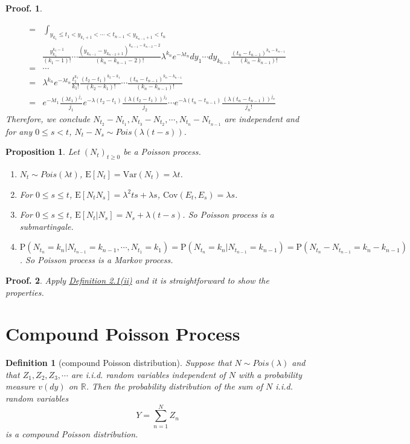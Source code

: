 \documentclass{article}
\newtheorem{definition}{Definition}[section]
\newtheorem{proposition}{Proposition}[section]
\theoremstyle{nonumberplain}
\newtheorem{Proof}{Proof.}
\begin{document}
\begin{Proof}
\begin{itemize}
\begin{align*}
	=&\ \int_{y_{k_1}\le t_1<y_{k_1+1}<\cdots<t_{n-1}<y_{k_{n-1}+1}<t_n}\\
	&\frac{y_{k_1}^{k_1-1}}{(k_1-1)!}\cdots\frac{(y_{k_{n-1}}-y_{k_{n-2}+1})^{k_{n-1}-k_{n-2}-2}}{(k_n-k_{n-1}-2)!}\lambda^{k_n}e^{-\lambda t_n}dy_1\cdots dy_{k_{n-1}}\frac{(t_{n}-t_{n-1})^{k_n-k_{n-1}}}{(k_n-k_{n-1})!}\\
	=&\cdots\\
	=&\lambda^{k_n}e^{-\lambda t_n}\frac{t_{1}^{k_1}}{k_1!}\frac{(t_{2}-t_{1})^{k_2-k_{1}}}{(k_2-k_{1})!}\cdots\frac{(t_{n}-t_{n-1})^{k_n-k_{n-1}}}{(k_n-k_{n-1})!}\\
	=&e^{-\lambda t_1}\frac{(\lambda t_1)^{j_1}}{j_1}e^{-\lambda(t_2- t_1)}\frac{(\lambda (t_2-t_1))^{j_2}}{j_2}\cdots e^{-\lambda(t_n-t_{n-1}) }\frac{(\lambda(t_{n}-t_{n-1}))^{j_n}}{j_n!}
\end{align*}
	Therefore, we conclude $N_{t_2}-N_{t_1},N_{t_3}-N_{t_2},\cdots,N_{t_n}-N_{t_{n-1}}$ are independent and for any $0\le s < t$, $N_t-N_s\sim Pois(\lambda(t-s))$.
\end{itemize}
\end{Proof}

\begin{proposition}
	Let $(N_t)_{t\ge0}$ be a Poisson process.
	\begin{enumerate}
		\item $N_t\sim Pois(\lambda t)$, $\mathrm{E}[N_t]=\mathrm{Var}(N_t)=\lambda t$.
		\item For $0\le s\le t$, $\mathrm{E}[N_tN_s]=\lambda^2ts+\lambda s$, $\mathrm{Cov}(E_t,E_s)=\lambda s$.
		\item For $0\le s\le t$, $\mathrm{E}[N_t|N_s]=N_s+\lambda(t-s)$. So Poisson process is a submartingale.
		\item $\mathrm{P}(N_{t_n}=k_n|N_{t_{n-1}}=k_{n-1},\cdots,N_{t_1}=k_1)=\mathrm{P}(N_{t_n}=k_n|N_{t_{n-1}}=k_{n-1})=\mathrm{P}(N_{t_n}-N_{t_{n-1}}=k_n-k_{n-1})$. So Poisson process is a Markov process.
	\end{enumerate}
\end{proposition}
\begin{Proof}
	Apply \hyperlink{Definition 2.1(ii)}{Definition 2.1(ii)} and it is straightforward to show the properties.
\end{Proof}

\section{Compound Poisson Process}
\begin{definition}[compound Poisson distribution]
	Suppose that
	$N\sim Pois(\lambda )$ and that $Z_{1},Z_{2},Z_{3},\cdots $ are i.i.d. random variables independent of $N$ with a probability measure $v(dy)$ on $\mathbb{R}$. Then the probability distribution of the sum of $N$ i.i.d. random variables
	\[
	Y=\sum _{n=1}^{N}Z_{n}
	\]
	is a \emph{compound Poisson distribution}.
\end{definition}
\end{document}
